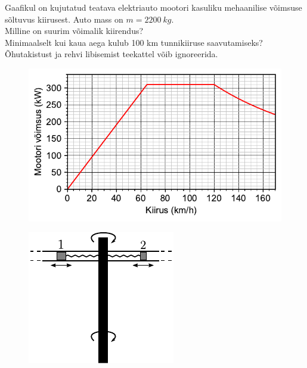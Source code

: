 \documentclass[10pt]{article}
\begin{document}

Gaafikul on kujutatud teatava elektriauto mootori kasuliku mehaanilise võimsuse sõltuvus kiirusest. Auto mass on $m=\SI{2200}{kg}$.\\
\osa Milline on suurim võimalik kiirendus?\\
\osa Minimaalselt kui kaua aega kulub 100 km tunnikiiruse saavutamiseks?\\
Õhutakistust ja rehvi libisemist teekattel võib ignoreerida.


\begin{figure}[h]
    \centering
    \vspace{-10pt}
    \includegraphics[width=0.75\linewidth]{2023-lahg-05-yl.pdf}
    \vspace{-35pt}
\end{figure}
\probend
\bigskip


\begin{figure}
  \vspace{-2em}
  \begin{center}
    \includegraphics[width=1\linewidth]{2023-v2g-05-yl.pdf}
  \end{center}
  \vspace{-2em}
\end{figure}
\end{document}
